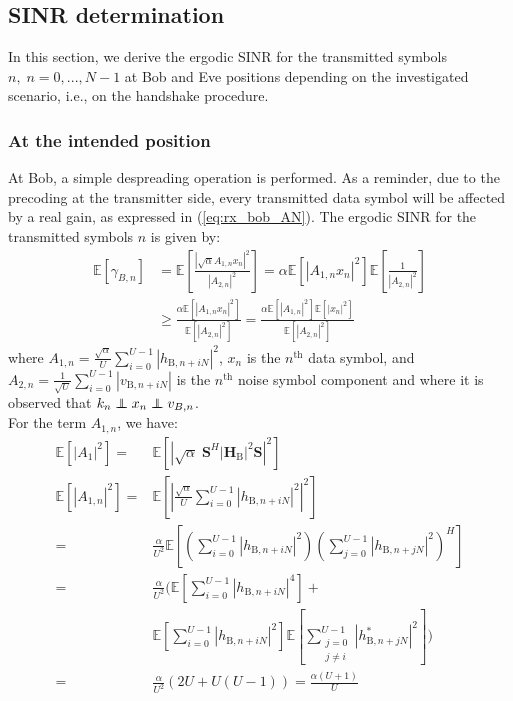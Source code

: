 \documentclass[journal,comsoc]{IEEEtran}
\newcommand{\module}[1]{\left|#1\right|}
\newcommand{\EX}[1]{\mathbb{E} \left[#1\right]}%
\newcommand{\HB}{\textbf{H}_{\text{B}}}
\newcommand{\spread}{\textbf{S}}
\newcommand\independent{\protect\mathpalette{\protect\independenT}{\perp}}
\def\independenT#1#2{\mathrel{\rlap{$#1#2$}\mkern2mu{#1#2}}}
\begin{document}

\subsection{SINR determination}
In this section, we derive the ergodic SINR for the transmitted symbols $n, \; n = 0,...,N-1$ at Bob and Eve positions depending on the investigated scenario, i.e., on the handshake procedure. 



\subsubsection{At the intended position}
At Bob, a simple despreading operation is performed. As a reminder, due to the precoding at the transmitter side, every transmitted data symbol will be affected by a real gain, as expressed in (\ref{eq:rx_bob_AN}). The ergodic SINR for the transmitted symbols $n$ is given by:
\begin{equation}
\begin{split}
\EX{\gamma_{B,n}} &= \EX{ \frac{  \left| \sqrt{\alpha} A_{1,n} x_n \right|^2  }{  \left| A_{2,n} \right|^2} }  = \alpha \EX{\left| A_{1,n}  x_n\right|^2}  \EX{\frac{1}{\left| A_{2,n} \right|^2}}  \\
& \geq  \frac{\alpha \EX{  \left| A_{1,n}  x_n\right|^2 } }{\EX{ \left| A_{2,n} \right|^2 }} =  \frac{\alpha \EX{ \left| A_{1,n}  \right|^2 } \EX{ \left| x_n \right|^2 } }{\EX{ \left| A_{2,n} \right|^2 }}
\label{eq:RV_sinr_b}
\end{split}
\end{equation}
where $A_{1,n} = \frac{\sqrt{\alpha}}{U}\sum_{i=0}^{U-1} \left| h_{\text{B}, n + iN}\right|^2$, $x_n$ is the $n^{\text{th}}$ data symbol, and $A_{2,n} = \frac{1}{\sqrt{U}}\sum_{i=0}^{U-1} \left| v_{\text{B}, n + iN}\right|$ is the $n^{\text{th}}$ noise symbol component and where it is observed that $k_n \independent x_n \independent v_{B,n}$.\\
For the term $A_{1,n}$, we have:
\begin{equation}
	\begin{split}
	\EX{|A_1|^2} =& \EX{\module{\sqrt{\alpha} \; \spread^H \module{\HB}^2 \spread}^2} \\
	\EX{|A_{1,n}|^2} =&\EX{\left|\frac{\sqrt{\alpha}}{U}\sum_{i=0}^{U-1} \left| h_{\text{B}, n + iN}\right|^2\right|^2}  \\
	=& \frac{\alpha}{U^2} \EX{\left(\sum_{i=0}^{U-1} \left| h_{\text{B}, n + iN}\right|^2\right) \left(\sum_{j=0}^{U-1} \left| h_{\text{B}, n + jN}\right|^2\right)^H}\\
	=&  \frac{\alpha}{U^2} \Big(\EX{\sum_{i=0}^{U-1}\left| h_{\text{B}, n + iN}\right|^4} +\\
	& \EX{\sum_{i=0}^{U-1}\left| h_{\text{B}, n + iN}\right|^2}\EX{\sum_{\substack{j=0 \\ j\neq i}}^{U-1} | h^*_{\text{B}, n + jN}|^2} \Big) \\
	=& \frac{\alpha}{U^2} \left( 2U + U(U-1)\right) = \frac{\alpha (U+1)}{U}
	\end{split}
	\label{eq:appA:data_bob}
\end{equation}
\end{document}
